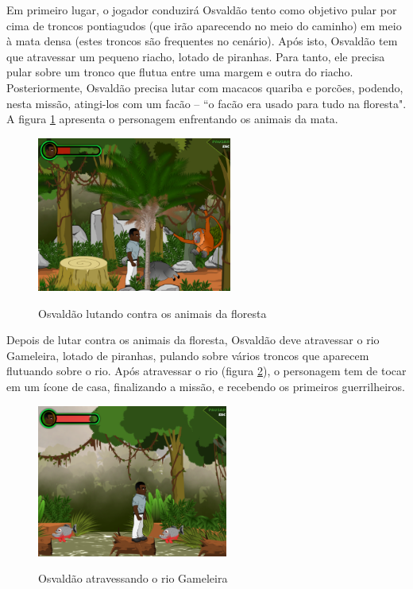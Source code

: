 Em primeiro lugar, o jogador conduzirá Osvaldão tento como objetivo pular por cima de troncos pontiagudos (que irão aparecendo no meio do caminho) em meio à mata densa (estes troncos são frequentes no cenário). Após isto, Osvaldão tem que atravessar um pequeno riacho, lotado de piranhas. Para tanto, ele precisa pular sobre um tronco que flutua entre uma margem e outra do riacho. Posteriormente, Osvaldão precisa lutar com macacos quariba e porcões, podendo, nesta missão, atingi-los com um facão -- ``o facão era usado para tudo na floresta"\space\cite{bib:jofilly2008}. A figura \ref{fig:osvaldo-animais} apresenta o personagem enfrentando os animais da mata.

\begin{figure}[H]
	\centering
	\caption{Osvaldão lutando contra os animais da floresta}
	\includegraphics[width=0.57\textwidth]{figuras/osvaldo_animais_fase2.png}
	\label{fig:osvaldo-animais}
	{}
\end{figure}

Depois de lutar contra os animais da floresta, Osvaldão deve atravessar o rio Gameleira, lotado de piranhas, pulando sobre vários troncos que aparecem flutuando sobre o rio. Após atravessar o rio (figura \ref{fig:osvaldo-gameleira}), o personagem tem de tocar em um ícone de casa, finalizando a missão, e recebendo os primeiros guerrilheiros.

\begin{figure}[H]
	\centering
	\caption{Osvaldão atravessando o rio Gameleira}
	\includegraphics[width=0.56\textwidth]{figuras/osvaldo_gameleira_fase2.png}
	\label{fig:osvaldo-gameleira}
	{}
\end{figure}


